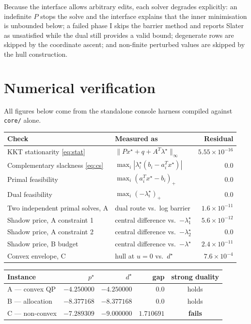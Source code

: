 \documentclass[11pt,a4paper]{article}
\theoremstyle{definition}
\newcommand{\pstar}{p^{\star}}
\newcommand{\dstar}{d^{\star}}
\newcommand{\xstar}{x^{\star}}
\newcommand{\lamstar}{\lambda^{\star}}
\begin{document}
Because the interface allows arbitrary edits, each solver degrades explicitly: an indefinite $P$
stops the solve and the interface explains that the inner minimisation is unbounded below; a
failed phase I skips the barrier method and reports Slater as unsatisfied while the dual still
provides a valid bound; degenerate rows are skipped by the coordinate ascent; and non-finite
perturbed values are skipped by the hull construction.

\section{Numerical verification}\label{sec:verify}

All figures below come from the standalone console harness compiled against \texttt{core/} alone.

\begin{center}
\begin{tabular}{llr}
\toprule
\textbf{Check} & \textbf{Measured as} & \textbf{Residual}\\
\midrule
KKT stationarity \eqref{eq:stat} & $\|P\xstar+q+A^{T}\lamstar\|_{\infty}$
  & $5.55\times 10^{-16}$\\
Complementary slackness \eqref{eq:cs} & $\max_{i}|\lambda_{i}^{\star}(b_{i}-a_{i}^{T}\xstar)|$
  & $0.0$\\
Primal feasibility & $\max_{i}(a_{i}^{T}\xstar-b_{i})_{+}$ & $0.0$\\
Dual feasibility & $\max_{i}(-\lambda_{i}^{\star})_{+}$ & $0.0$\\
Two independent primal solves, A & dual route vs.\ log barrier & $1.6\times 10^{-11}$\\
Shadow price, A constraint 1 & central difference vs.\ $-\lambda_{1}^{\star}$
  & $5.6\times 10^{-12}$\\
Shadow price, A constraint 2 & central difference vs.\ $-\lambda_{2}^{\star}$ & $0.0$\\
Shadow price, B budget & central difference vs.\ $-\lamstar$ & $2.4\times 10^{-11}$\\
Convex envelope, C & hull at $u=0$ vs.\ $\dstar$ & $7.6\times 10^{-4}$\\
\bottomrule
\end{tabular}
\end{center}

\vspace{0.4cm}

\begin{center}
\begin{tabular}{lrrrc}
\toprule
\textbf{Instance} & $\pstar$ & $\dstar$ & \textbf{gap} & \textbf{strong duality}\\
\midrule
A --- convex QP   & $-4.250000$ & $-4.250000$ & $0.0$      & holds\\
B --- allocation  & $-8.377168$ & $-8.377168$ & $0.0$      & holds\\
C --- non-convex  & $-7.289309$ & $-9.000000$ & $1.710691$ & \textbf{fails}\\
\bottomrule
\end{tabular}
\end{center}
\end{document}
